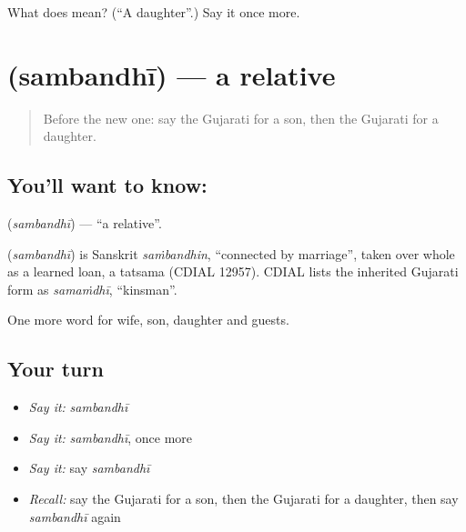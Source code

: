 \begin{tcolorbox}[breakable,colback=teal!4,colframe=teal!35!black,title={Before you move on}]
What does  mean? (\textquotedblleft{}A daughter\textquotedblright{}.) Say it once more.
\end{tcolorbox}
\section[\texorpdfstring{\gu{સંબંધી} (sambandhī)}{સંબંધી (sambandhī)}]{ (sambandhī) — a relative}

\label{lesson:GU-C53-relative}



\begin{quote}
Before the new one: say the Gujarati for a son, then the Gujarati for a daughter.
\end{quote}

\subsection*{You'll want to know: }
\textbf{} (\emph{sambandhī}) — \textquotedblleft{}a relative\textquotedblright{}.

\begin{cousinweb}
\textbf{} (\emph{sambandhī}) is Sanskrit \emph{saṁbandhin}, \textquotedblleft{}connected by marriage\textquotedblright{}, taken over whole as a learned loan, a tatsama (CDIAL 12957). CDIAL lists the inherited Gujarati form as \emph{samaṁdhī}, \textquotedblleft{}kinsman\textquotedblright{}.
\end{cousinweb}

\begin{grammarlens}[title={What you've built}]
One more word for wife, son, daughter and guests.
\end{grammarlens}

\subsection*{Your turn}
\begin{itemize}
\raggedright
  \item \emph{Say it:} \emph{sambandhī}
  \item \emph{Say it:} \emph{sambandhī}, once more
  \item \emph{Say it:} say \emph{sambandhī}
  \item \emph{Recall:} say the Gujarati for a son, then the Gujarati for a daughter, then say \emph{sambandhī} again
\end{itemize}

